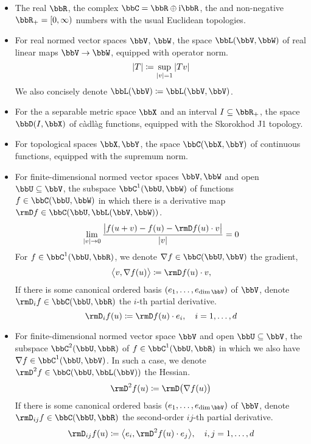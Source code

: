\begin{itemize}
  \item
    The real $\bbR$, the complex $\bbC = \bbR \oplus \im\bbR$, the and non-negative $\bbR_+ = [0,\infty)$ numbers with the usual Euclidean topologies.
  \item
    For real normed vector spaces $\vecSpace$, $\bbW$, the space $\bbL(\vecSpace,\bbW)$ of real linear maps $\vecSpace \rightarrow \bbW$, equipped with operator norm.
    \begin{equation*}
      |T| \coloneqq \sup_{|v|=1} |Tv|
    \end{equation*}
    We also concisely denote $\bbL(\vecSpace) \defeq \bbL(\vecSpace, \vecSpace)$.
  \item
    For the a separable metric space $\stateSpace$ and an interval $I \subseteq \bbR_+$, the space $\pathSpace{I}{\stateSpace}$ of c\`adl\`ag functions, equipped with the Skorokhod J1 topology.
  \item
    For topological spaces $\stateSpace, \bbY$, the space $\cpathSpace{\stateSpace}{\bbY}$ of continuous functions, equipped with the supremum norm.
  \item
    For finite-dimensional normed vector spaces $\vecSpace, \bbW$ and open $\bbU \subseteq \vecSpace$, the subspace $\ccpathSpace{1}{\bbU}{\bbW}$ of functions $f \in \cpathSpace{\bbU}{\bbW}$ in which there is a derivative map $\Der f \in \cpathSpace{\bbU}{\bbL(\vecSpace,\bbW)}$.
    \[
      \lim_{|\vecVar|\rightarrow0} \frac{\big| f(\momentVar + \vecVar) - f(\momentVar) - \Der f(\momentVar) \cdot \vecVar\big|}{|\vecVar|} = 0
    \]
    For $f \in \ccpathSpace{1}{\bbU}{\bbR}$, we denote $\nabla f \in \cpathSpace{\bbU}{\vecSpace}$ the gradient,
    \[
      \bprj{\vecVar}{\nabla f(\momentVar)} \defeq \Der f(\momentVar) \cdot \vecVar,
    \]
    If there is some canonical ordered basis $(\basisVec_1, \ldots, \basisVec_{\operatorname{dim}\vecSpace})$ of $\vecSpace$, denote $\Der_i f \in \cpathSpace{\bbU}{\bbR}$ the $i$-th partial derivative.
    \[
      \Der_i f(\momentVar) \defeq \Der f(\momentVar) \cdot \basisVec_i, \quad i = 1,\ldots, d
    \]
  \item
    For finite-dimensional normed vector space $\vecSpace$ and open $\bbU \subseteq \vecSpace$, the subspace $\ccpathSpace{2}{\bbU}{\bbR}$ of $f \in \ccpathSpace{1}{\bbU}{\bbR}$ in which we also have $\nabla f \in \ccpathSpace{1}{\bbU}{\vecSpace}$.
    In such a case, we denote $\Hess f \in \cpathSpace{\bbU}{\bbL(\vecSpace)}$ the Hessian.
    \[
      \Hess f(\momentVar) \defeq \Der\big( \nabla f(u) \big)
    \]
    If there is some canonical ordered basis $(\basisVec_1, \ldots, \basisVec_{\operatorname{dim}\vecSpace})$ of $\vecSpace$, denote $\Der_{ij} f \in \cpathSpace{\bbU}{\bbR}$ the second-order $ij$-th partial derivative.
    \[
      \Der_{ij} f(\momentVar) \defeq \bprj{\basisVec_i}{\Hess f(\momentVar) \cdot \basisVec_j}, \quad i,j = 1, \ldots, d
    \]
\end{itemize}
